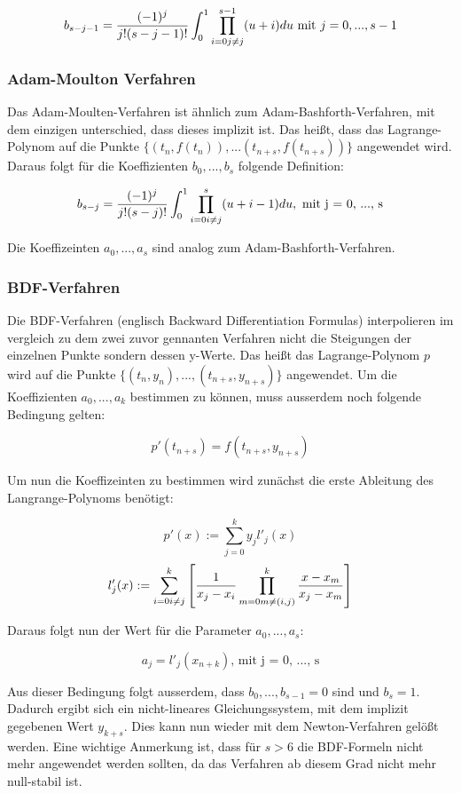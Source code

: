 $$
b_{s - j - 1} = \frac{(-1)^j}{j!(s- j -1 )!} \int_0^1 \prod_{i = 0 \\ j \neq j}^{s-1} (u + i) du \text{ mit } j = 0, ...,  s-1 
$$

\subsubsection{Adam-Moulton Verfahren} \label{adam-moulton}

Das Adam-Moulten-Verfahren ist ähnlich zum
Adam-Bashforth-Verfahren, mit dem einzigen unterschied, dass dieses implizit ist.
Das heißt, dass das Lagrange-Polynom auf die Punkte $\{(t_{n}, f(t_{n})), ... (t_{n+s}, f(t_{n+s}))\} $ angewendet wird.
Daraus folgt für die Koeffizienten $b_{0}, ..., b_{s}$ folgende Definition:

$$
b_{s - j} = \frac{(-1)^j}{j!(s - j)!} \int_0^{1} \prod_{i = 0 \\ i \neq j}^{s} (u + i - 1) du, \text{ mit j = 0, ..., s}
$$

Die Koeffizeinten $a_0, ..., a_s$ sind analog zum Adam-Bashforth-Verfahren.


\subsubsection{BDF-Verfahren} \label{sec:bdf}

Die BDF-Verfahren (englisch Backward Differentiation Formulas) interpolieren im vergleich zu dem zwei zuvor gennanten Verfahren nicht 
die Steigungen der einzelnen Punkte sondern dessen y-Werte.
Das heißt das Lagrange-Polynom $p$ wird auf die Punkte $\{ (t_n, y_n), ..., (t_{n + s}, y_{n + s}) \}$ angewendet.
Um die Koeffizienten $a_0, ..., a_k$ bestimmen zu können, muss ausserdem noch folgende Bedingung gelten:

$$
p'(t_{n + s}) = f(t_{n + s}, y_{n + s})
$$

Um nun die Koeffizeinten zu bestimmen wird zunächst die erste Ableitung des Langrange-Polynoms benötigt:

$$
p'(x) := \sum_{j = 0}^{k} y_j l'_j(x)
$$
$$
l'_j(x) := \sum_{i = 0 \\ i \neq j}^{k} \left[ \frac{1}{x_j - x_i} \prod_{m = 0 \\ m \neq (i, j)}^k \frac{x - x_m}{x_j - x_m} \right]
$$

Daraus folgt nun der Wert für die Parameter $a_0, ... ,a_s$:

$$
a_j = l'_j(x_{n + k}) \text{, mit j = 0, ..., s}
$$

Aus dieser Bedingung folgt ausserdem, dass $b_0, ...,b_{s - 1} = 0$ sind und $b_s = 1$.
Dadurch ergibt sich ein nicht-lineares Gleichungssystem, mit dem implizit gegebenen Wert $y_{k + s}$.
Dies kann nun wieder mit dem Newton-Verfahren gelößt werden.
Eine wichtige Anmerkung ist, 
dass für $s > 6$ die BDF-Formeln nicht mehr angewendet werden sollten, 
da das Verfahren ab diesem Grad nicht mehr null-stabil ist.
